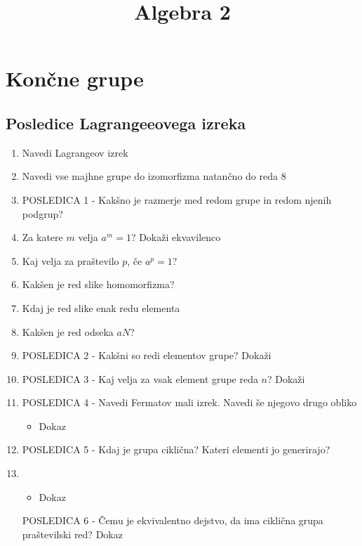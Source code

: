 \documentclass{article}
\title{Algebra 2}
\begin{document}
    \maketitle

    \section{Končne grupe}
    \subsection{Posledice Lagrangeeovega izreka}
    \begin{enumerate}
        \item Navedi Lagrangeov izrek
        \item Navedi vse majhne grupe do izomorfizma natančno do reda 8
        \item POSLEDICA 1 - Kakšno je razmerje med redom grupe in redom njenih podgrup?
        \item Za katere $m$ velja $a^m = 1$? Dokaži ekvavilenco
        \item Kaj velja za praštevilo $p$, če $a^p = 1$?
        \item Kakšen je red slike homomorfizma?
        \item Kdaj je red slike enak redu elementa
        \item Kakšen je red odseka $aN$?
        \item POSLEDICA 2 - Kakšni so redi elementov grupe? Dokaži
        \item POSLEDICA 3 - Kaj velja za vsak element grupe reda $n$? Dokaži
        \item POSLEDICA 4 - Navedi Fermatov mali izrek. Navedi še njegovo drugo obliko
        \begin{itemize}
            \item Dokaz
        \end{itemize} 
        \item POSLEDICA 5 - Kdaj je grupa ciklična? Kateri elementi jo generirajo?
        \item \begin{itemize}
            \item Dokaz
        \end{itemize} POSLEDICA 6 - Čemu je ekvivalentno dejstvo, da ima ciklična grupa praštevilski red? Dokaz
    \end{enumerate}
\end{document}
